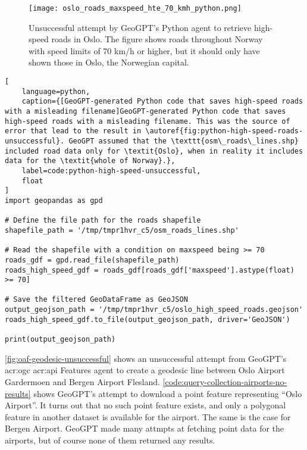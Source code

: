 \begin{figure}[htbp]
    \centering
    \texttt{[image: oslo\_roads\_maxspeed\_hte\_70\_kmh\_python.png]}
    \caption[Unsuccessful attempt by GeoGPT's Python agent to retrieve high-speed roads in Oslo]{Unsuccessful attempt by GeoGPT's Python agent to retrieve high-speed roads in Oslo. The figure shows roads throughout Norway with speed limits of 70 km/h or higher, but it should only have shown those in Oslo, the Norwegian capital.}
    \label{fig:python-high-speed-roads-unsuccessful}
\end{figure}

\FloatBarrier

\begin{lstlisting}[
    language=python,
    caption={[GeoGPT-generated Python code that saves high-speed roads with a misleading filename]GeoGPT-generated Python code that saves high-speed roads with a misleading filename. This was the source of error that lead to the result in \autoref{fig:python-high-speed-roads-unsuccessful}. GeoGPT assumed that the \texttt{osm\_roads\_lines.shp} included road data only for \textit{Oslo}, when in reality it includes data for the \textit{whole of Norway}.},
    label=code:python-high-speed-unsuccessful,
    float
]
import geopandas as gpd

# Define the file path for the roads shapefile
shapefile_path = '/tmp/tmpr1hvr_c5/osm_roads_lines.shp'

# Read the shapefile with a condition on maxspeed being >= 70
roads_gdf = gpd.read_file(shapefile_path)
roads_high_speed_gdf = roads_gdf[roads_gdf['maxspeed'].astype(float) >= 70]

# Save the filtered GeoDataFrame as GeoJSON
output_geojson_path = '/tmp/tmpr1hvr_c5/oslo_high_speed_roads.geojson'
roads_high_speed_gdf.to_file(output_geojson_path, driver='GeoJSON')

print(output_geojson_path)
\end{lstlisting}

\FloatBarrier

\autoref{fig:oaf-geodesic-unsuccessful} shows an unsuccessful attempt from GeoGPT's \acrshort{acr:ogc} \acrshort{acr:api} Features agent to create a geodesic line between Oslo Airport Gardermoen and Bergen Airport Flesland. \autoref{code:query-collection-airports-no-results} shows GeoGPT's attempt to download a point feature representing \enquote{Oslo Airport}. It turns out that no such point feature exists, and only a polygonal feature in another dataset is available for the airport. The same is the case for Bergen Airport. GeoGPT made many attmpts at fetching point data for the airports, but of course none of them  returned any results.

